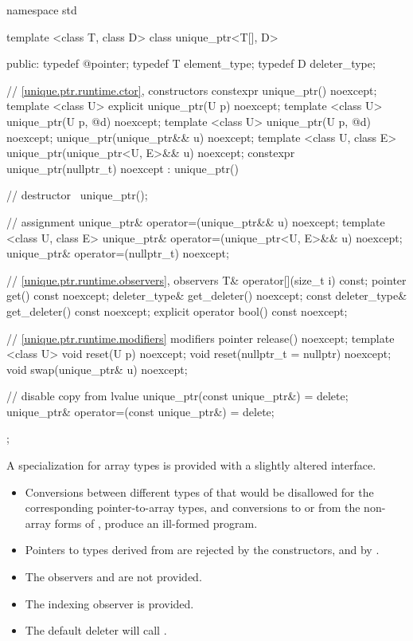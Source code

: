 \begin{codeblock}
namespace std {
  template <class T, class D> class unique_ptr<T[], D> {
  public:
    typedef @\seebelow@ pointer;
    typedef T element_type;
    typedef D deleter_type;

    // \ref{unique.ptr.runtime.ctor}, constructors
    constexpr unique_ptr() noexcept;
    template <class U> explicit unique_ptr(U p) noexcept;
    template <class U> unique_ptr(U p, @\seebelow@ d) noexcept;
    template <class U> unique_ptr(U p, @\seebelow@ d) noexcept;
    unique_ptr(unique_ptr&& u) noexcept;
    template <class U, class E>
      unique_ptr(unique_ptr<U, E>&& u) noexcept;
    constexpr unique_ptr(nullptr_t) noexcept : unique_ptr() { }

    // destructor
    ~unique_ptr();

    // assignment
    unique_ptr& operator=(unique_ptr&& u) noexcept;
    template <class U, class E>
      unique_ptr& operator=(unique_ptr<U, E>&& u) noexcept;
    unique_ptr& operator=(nullptr_t) noexcept;

    // \ref{unique.ptr.runtime.observers}, observers
    T& operator[](size_t i) const;
    pointer get() const noexcept;
    deleter_type& get_deleter() noexcept;
    const deleter_type& get_deleter() const noexcept;
    explicit operator bool() const noexcept;

    // \ref{unique.ptr.runtime.modifiers} modifiers
    pointer release() noexcept;
    template <class U> void reset(U p) noexcept;
    void reset(nullptr_t = nullptr) noexcept;
    void swap(unique_ptr& u) noexcept;

    // disable copy from lvalue
    unique_ptr(const unique_ptr&) = delete;
    unique_ptr& operator=(const unique_ptr&) = delete;
  };
}
\end{codeblock}

\pnum
A specialization for array types is provided with a slightly altered
interface.

\begin{itemize}
\item Conversions between different types of
that would be disallowed for the corresponding pointer-to-array types,
and conversions to or from the non-array forms of
, produce an ill-formed program.

\item Pointers to types derived from  are
rejected by the constructors, and by .

\item The observers  and
 are not provided.

\item The indexing observer  is provided.

\item The default deleter will call .
\end{itemize}

